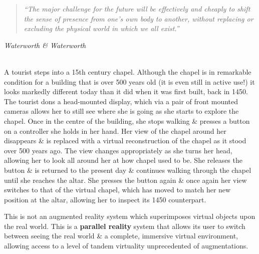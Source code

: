 \begin{quote}
	\textit{``The major challenge for the future will be effectively and cheaply to shift the sense of presence from one's own body to another, without replacing or excluding the physical world in which we all exist.''}
\end{quote}
\hfill \textit{Waterworth \& Waterworth}~\cite{Waterworth2014}
\\
\\

\label{introduction}


A tourist steps into a 15th century chapel. Although the chapel is in remarkable condition for a building that is over 500 years old (it is even still in active use!) it looks markedly different today than it did when it was first built, back in 1450. The tourist dons a head-mounted display, which via a pair of front mounted cameras allows her to still see where she is going as she starts to explore the chapel. Once in the centre of the building, she stops walking \& presses a button on a controller she holds in her hand. Her view of the chapel around her disappears \& is replaced with a virtual reconstruction of the chapel as it stood over 500 years ago. The view changes appropriately as she turns her head, allowing her to look all around her at how chapel used to be. She releases the button \& is returned to the present day \& continues walking through the chapel until she reaches the altar. She presses the button again \& once again her view switches to that of the virtual chapel, which has moved to match her new position at the altar, allowing her to inspect its 1450 counterpart.

This is not an augmented reality system which superimposes virtual objects upon the real world. This is a \textbf{parallel reality} system that allows its user to switch between seeing the real world \& a complete, immersive virtual environment, allowing access to a level of tandem virtuality unprecedented of augmentations.


